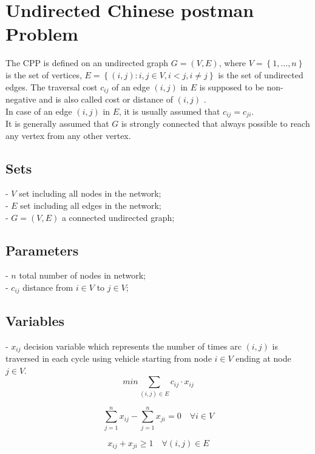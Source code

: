 \documentclass[a4paper,12pt,titlepage]{article}
\begin{document}
	\section*{Undirected Chinese postman Problem}
	
	The CPP is defined on an undirected graph $G=(V,E)$, where $V=\left\lbrace 1,…, n\right\rbrace $ is the set of vertices, $E =\left\lbrace (i,j)
	: i, j\in V, i<j, i\neq j\right\rbrace $ is the set of undirected edges. The traversal cost $c_{ij}$ of an edge $(i,j)$ in $E$ is supposed to be non-negative and is also called cost or distance of $(i,j)$ .\\ 
	In case of an edge $(i,j)$ in $E$, it is usually assumed that $c_{ij} = c_ {ji}$. \\
	It is generally assumed that $G$ is strongly connected that always possible to reach any vertex from any other vertex.
	\subsection*{Sets}
	- $V$ set including all nodes in the network;\\
	- $E$ set including all edges in the network;\\
	- $G=(V,E)$ a connected undirected graph;
	\subsection*{Parameters}
	- $n$ total number of nodes in network;\\
	- $c_{ij}$ distance from $i \in V$ to $j \in V$;
	\subsection*{Variables}
	- $x_{ij}$ decision variable which represents the number of times arc $(i,j)$ is traversed in each cycle using vehicle starting from node $i\in V$ ending at node $j\in V$.
	\begin{equation}
	min \sum_{(i,j)\in E}c_{ij} \cdot x_{ij}
	\end{equation}
	
	\begin{equation}
	\sum_{j=1}^{n} x_{ij} - \sum_{j=1}^{n} x_{ji} = 0 \quad \forall i\in V
	\end{equation}
	
	\begin{equation}
	x_{ij} + x_{ji} \geq 1 \quad \forall (i,j)\in E
	\end{equation}
	
\end{document}
